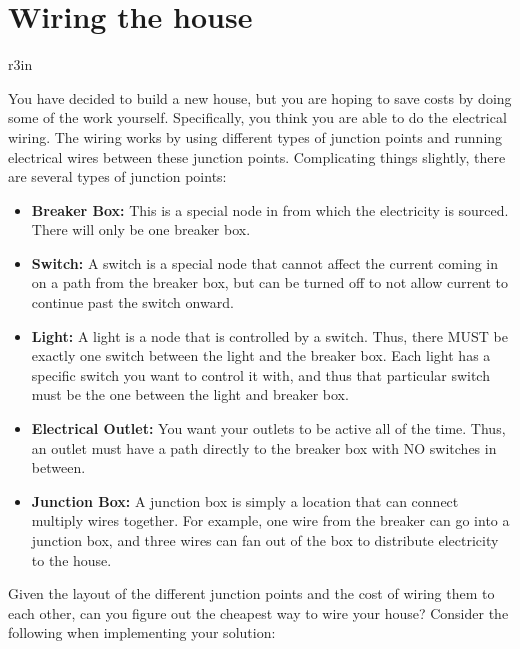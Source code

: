 \documentclass[11pt]{article}
\begin{document}
\section*{Wiring the house}


\begin{wrapfigure}{r}{3in}
\vspace{-10pt}
\vspace{-30pt}
\end{wrapfigure}

You have decided to build a new house, but you are hoping to save costs by doing some of the work yourself. Specifically, you think you are able to do the electrical wiring. The wiring works by using different types of junction points and running electrical wires between these junction points. Complicating things slightly, there are several types of junction points:

\begin{itemize}
	\item \textbf{Breaker Box:} This is a special node in from which the electricity is sourced. There will only be one breaker box.
	\item \textbf{Switch:} A switch is a special node that cannot affect the current coming in on a path from the breaker box, but can be turned off to not allow current to continue past the switch onward.
	\item \textbf{Light:} A light is a node that is controlled by a switch. Thus, there MUST be exactly one switch between the light and the breaker box. Each light has a specific switch you want to control it with, and thus that particular switch must be the one between the light and breaker box.
	\item \textbf{Electrical Outlet:} You want your outlets to be active all of the time. Thus, an outlet must have a path directly to the breaker box with NO switches in between.
	\item \textbf{Junction Box:} A junction box is simply a location that can connect multiply wires together. For example, one wire from the breaker can go into a junction box, and three wires can fan out of the box to distribute electricity to the house.
\end{itemize}

Given the layout of the different junction points and the cost of wiring them to each other, can you figure out the cheapest way to wire your house? Consider the following when implementing your solution:
\end{document}
